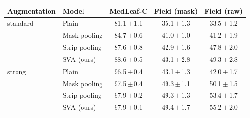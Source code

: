 \begin{tabular}{llccc}
\toprule
Augmentation & Model & MedLeaf-C & Field (mask) & Field (raw) \\
\midrule
standard & Plain & 81.1\,$\pm$\,1.1 & 35.1\,$\pm$\,1.3 & 33.5\,$\pm$\,1.2 \\
 & Mask pooling & 84.7\,$\pm$\,0.6 & 41.0\,$\pm$\,1.0 & 41.2\,$\pm$\,1.9 \\
 & Strip pooling & 87.6\,$\pm$\,0.8 & 42.9\,$\pm$\,1.6 & 47.8\,$\pm$\,2.0 \\
 & SVA (ours) & 88.6\,$\pm$\,0.5 & 43.1\,$\pm$\,2.8 & 49.3\,$\pm$\,2.8 \\
\midrule
strong & Plain & 96.5\,$\pm$\,0.4 & 43.1\,$\pm$\,1.3 & 42.0\,$\pm$\,1.7 \\
 & Mask pooling & 97.5\,$\pm$\,0.4 & 49.3\,$\pm$\,1.1 & 50.1\,$\pm$\,1.5 \\
 & Strip pooling & 97.9\,$\pm$\,0.2 & 49.3\,$\pm$\,1.3 & 53.4\,$\pm$\,1.7 \\
 & SVA (ours) & 97.9\,$\pm$\,0.1 & 49.4\,$\pm$\,1.7 & 55.2\,$\pm$\,2.0 \\
\bottomrule
\end{tabular}